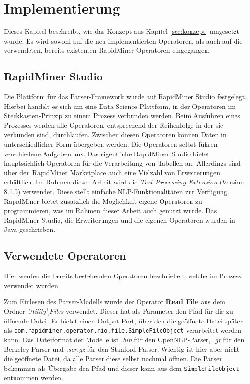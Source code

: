 %
\chapter{Implementierung}
\label{sec:impl}
Dieses Kapitel beschreibt, wie das Konzept aus Kapitel \ref{sec:konzept} umgesetzt wurde. Es wird sowohl auf die neu implementierten Operatoren, als auch auf die verwendeten, bereits existenten RapidMiner-Operatoren eingegangen. 

\section{RapidMiner Studio}
\label{sec:impl:rms}

Die Plattform für das Parser-Framework wurde auf RapidMiner Studio \cite{rmstudio} festgelegt. Hierbei handelt es sich um eine Data Science Plattform, in der Operatoren im Steckkasten-Prinzip zu einem Prozess verbunden werden. Beim Ausführen eines Prozesses werden alle Operatoren, entsprechend der Reihenfolge in der sie verbunden sind, durchlaufen. Zwischen diesen Operatoren können Daten in unterschiedlicher Form übergeben werden. Die Operatoren selbst führen verschiedene Aufgaben aus. Das eigentliche RapidMiner Studio bietet hauptsächlich Operatoren für die Verarbeitung von Tabellen an. Allerdings sind über den RapidMiner Marketplace auch eine Vielzahl von Erweiterungen erhältlich. Im Rahmen dieser Arbeit wird die \textit{Text-Processing-Extension} (Version 8.1.0) \cite{textExt} %
verwendet. Diese stellt einfache NLP-Funktionalitäten zur Verfügung. RapidMiner bietet zusätzlich die Möglichkeit eigene Operatoren zu programmieren, was im Rahmen dieser Arbeit auch genutzt wurde. Das RapidMiner Studio, die Erweiterungen und die eigenen Operatoren wurden in Java geschrieben. \\

\section{Verwendete Operatoren}
\label{sec:impl:vwo}

Hier werden die bereits bestehenden Operatoren beschrieben, welche im Prozess verwendet wurden.

Zum Einlesen des Parser-Modells wurde der Operator \textbf{Read File} aus dem Ordner \textit{Utility\textbackslash Files} verwendet. Dieser hat als Parameter den Pfad für die zu öffnende Datei. Er bietet einen Output-Port, über den die geöffnete Datei später als \texttt{com.rapidminer.operator.nio.file.SimpleFileObject} verarbeitet werden kann. Das Dateiformat der Modelle ist \textit{.bin} für den OpenNLP-Parser, \textit{.gr} für den Berkeley-Parser und \textit{.ser.gz} für den Stanford-Parser. Wichtig ist hier aber nicht die geöffnete Datei, da alle Parser diese selbst nochmal öffnen. Die Parser bekommen als Übergabe den Pfad und dieser kann aus dem \texttt{SimpleFileObject} entnommen werden.


